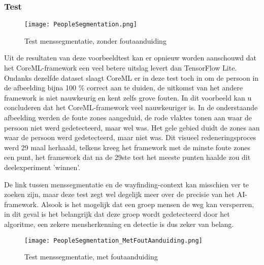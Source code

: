 \subsubsection{Test}

\begin{figure}[H]
	\centering
	\texttt{[image: PeopleSegmentation.png]}
	\caption{Test menssegmentatie, zonder foutaanduiding}
\end{figure}
\pagebreak

Uit de resultaten van deze voorbeeldtest kan er opnieuw worden aanschouwd dat het CoreML-framework een veel betere uitslag levert dan TensorFlow Lite. Ondanks dezelfde dataset slaagt CoreML er in deze test toch in om de persoon in de afbeelding bijna 100 \% correct aan te duiden, de uitkomst van het andere framework is niet nauwkeurig en kent zelfs grove fouten. In dit voorbeeld kan u concluderen dat het CoreML-framework veel nauwkeuriger is. In de onderstaande afbeelding werden de foute zones aangeduid, de rode vlaktes tonen aan waar de persoon niet werd gedetecteerd, maar wel was. Het gele gebied duidt de zones aan waar de persoon werd gedetecteerd, maar niet was. Dit visueel redeneringsproces werd 29 maal herhaald, telkens kreeg het framework met de minste foute zones een punt, het framework dat na de 29ste test het meeste punten haalde zou dit deelexperiment 'winnen'.

 De link tussen menssegmentatie en de wayfinding-context kan misschien ver te zoeken zijn, maar deze test zegt wel degelijk meer over de precisie van het AI-framework. Alsook is het mogelijk dat een groep mensen de weg kan versperren, in dit geval is het belangrijk dat deze groep wordt gedetecteerd door het algoritme, een zekere mensherkenning en detectie is dus zeker van belang.

\begin{figure}[H]
	\centering
	\texttt{[image: PeopleSegmentation\_MetFoutAanduiding.png]}
	\caption{Test menssegmentatie, met foutaanduiding}
\end{figure}
\pagebreak
